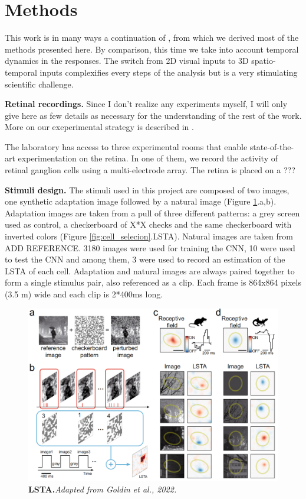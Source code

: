 \section{Methods}\label{sec:methods}

This work is in many ways a continuation of
\cite{goldin_context-dependent_2022}, from which we derived most of the methods
presented here. By comparison, this time we take into account temporal dynamics
in the responses. The switch from 2D visual inputs to 3D spatio-temporal inputs
complexifies every steps of the analysis but is a very stimulating scientific
challenge.

\textbf{Retinal recordings.}
Since I don't realize any experiments myself, I will only give here as few
details
as necessary for the understanding of the rest of the work. More on our
exeperimental strategy
is described in \cite{goldin_context-dependent_2022}.

The laboratory has access to three experimental rooms that enable
state-of-the-art experimentation
on the retina.	In one of them, we record the activity of retinal ganglion
cells using a multi-electrode array. The retina is placed on a ???

\textbf{Stimuli design.}
The stimuli used in this project are composed of two images, one synthetic
adaptation image followed by a natural image (Figure \ref{fig:LSTA}.a,b).
Adaptation images are taken from
a pull of three different patterns: a grey screen used as control, a
checkerboard of X*X checks and the same checkerboard with inverted colors
(Figure \ref{fig:cell_selecion}.LSTA). Natural images are taken from ADD
REFERENCE. 3180 images were used for
training the CNN, 10 were used to test the CNN and among them, 3 were used to
record an estimation of the LSTA of each cell.
Adaptation and natural images are always paired together to form a single
stimulus pair, also referenced as a clip. Each frame is 864x864 pixels (3.5
\textmu m) wide and each clip is 2*400ms long. %

\begin{figure}
    \centering
    \includegraphics[width=\textwidth]{pics/LSTAExplainV2.png}
    \caption{\textbf{LSTA.}\textit{Adapted from Goldin et al., 2022.}  }
    \label{fig:LSTA}
\end{figure}


